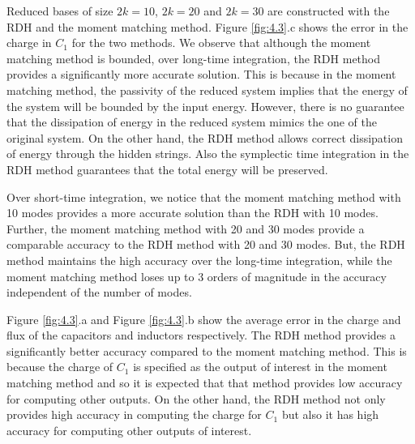 Reduced bases of size $2k = 10$, $2k = 20$ and $2k = 30$ are constructed with the RDH and the moment matching method. Figure \ref{fig:4.3}.c shows the error in the charge in $C_1$ for the two methods. We observe that although the moment matching method is bounded, over long-time integration, the RDH method provides a significantly more accurate solution. This is because in the moment matching method, the passivity of the reduced system implies that the energy of the system will be bounded by the input energy. However, there is no guarantee that the dissipation of energy in the reduced system mimics the one of the original system. On the other hand, the RDH method allows correct dissipation of energy through the hidden strings. Also the symplectic time integration in the RDH method guarantees that the total energy will be preserved.

Over short-time integration, we notice that the moment matching method with 10 modes provides a more accurate solution than the RDH with 10 modes. Further, the moment matching method with 20 and 30 modes provide a comparable accuracy to the RDH method with 20 and 30 modes. But, the RDH method maintains the high accuracy over the long-time integration, while the moment matching method loses up to 3 orders of magnitude in the accuracy independent of the number of modes.

Figure \ref{fig:4.3}.a and Figure \ref{fig:4.3}.b show the average error in the charge and flux of the capacitors and inductors respectively. The RDH method provides a significantly better accuracy compared to the moment matching method. This is because the charge of $C_1$ is specified as the output of interest in the moment matching method and so it is expected that that method provides low accuracy for computing other outputs. On the other hand, the RDH method not only provides high accuracy in computing the charge for $C_1$ but also it has high accuracy for computing other outputs of interest.

